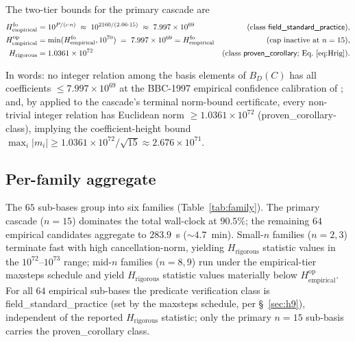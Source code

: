 \documentclass[11pt,a4paper]{article}
\newcommand{\Hrig}{H_{\mathrm{rigorous}}}
\newcommand{\Hempop}{H_{\mathrm{empirical}}^{\mathrm{op}}}
\newcommand{\Hempfo}{H_{\mathrm{empirical}}^{\mathrm{fo}}}
\newcommand{\BDC}{B_{D}(C)}
\newcommand{\fsp}{\textsf{field\_standard\_practice}}
\newcommand{\pc}{\textsf{proven\_corollary}}
\begin{document}
The two-tier bounds for the primary cascade are
\begin{align*}
\Hempfo &= 10^{P/(c\,n)}
       \;\approx\; 10^{2160 / (2.06\cdot 15)}
       \;\approx\; 7.997\times 10^{69}
       & \text{(class \fsp{})}, \\
\Hempop &= \min(\Hempfo, 10^{70})
       \;=\; 7.997\times 10^{69} = \Hempfo
       & \text{(cap inactive at $n=15$)}, \\
\Hrig   &= 1.0361\times 10^{72}
       & \text{(class \pc{}; Eq.~\eqref{eq:Hrig})}.
\end{align*}

In words: no integer relation among the basis elements of $\BDC$ has all
coefficients $\le 7.997\times 10^{69}$ at the BBC-1997 empirical
confidence calibration of \cite[\S 2]{bailey1998}; and, by
\cite[Theorem~1 + Corollary~2]{fba1999} applied to the cascade's terminal
norm-bound certificate, every non-trivial integer relation has Euclidean
norm $\ge 1.0361\times 10^{72}$ (\pc{}-class), implying the
coefficient-height bound
$\max_{i}|m_{i}| \ge 1.0361\times 10^{72}/\sqrt{15} \approx 2.676\times 10^{71}$.

\subsection{Per-family aggregate}\label{sec:results-family}

The $65$ sub-bases group into six families
(Table~\ref{tab:family}).
The primary cascade ($n=15$) dominates the total wall-clock at $90.5\%$;
the remaining $64$ empirical candidates aggregate to $283.9$~s
($\sim 4.7$~min).
Small-$n$ families ($n=2, 3$) terminate fast with high cancellation-norm,
yielding $\Hrig$ statistic values in the $10^{72}$--$10^{73}$ range; mid-$n$
families ($n=8, 9$) run under the empirical-tier maxsteps schedule and
yield $\Hrig$ statistic values materially below $\Hempop$.
For all $64$ empirical sub-bases the predicate verification class is
\fsp{} (set by the maxsteps schedule, per \S~\ref{sec:h9}), independent of
the reported $\Hrig$ statistic; only the primary $n=15$ sub-basis carries
the \pc{} class.
\end{document}
